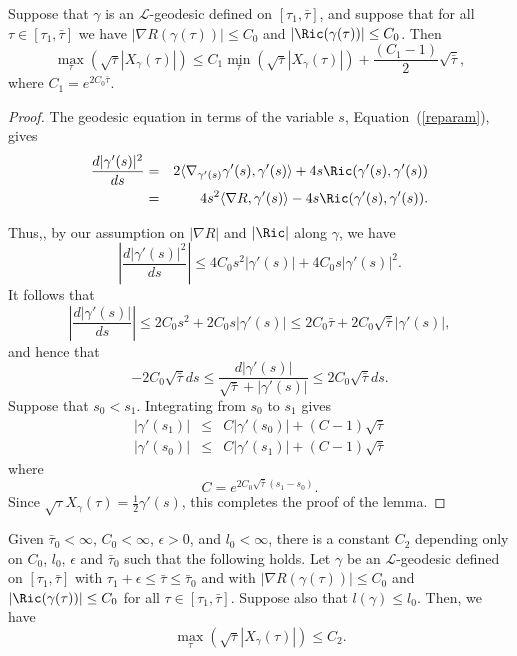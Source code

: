 \begin{lemma}\label{lem:l-geodesic-min-max-estimate}
\label{min-max}
 Suppose  that
$\gamma$ is an ${\mathcal L}$-geodesic defined on
$[\tau_1,\bar\tau]$, and suppose that for all $\tau\in
[\tau_1,\bar\tau]$ we have $|\nabla R(\gamma(\tau))|\le C_0$ and
$|\Ric(\gamma(\tau))|\le C_0$. Then
$$\max_{\tau}\left(\sqrt{\tau}|X_\gamma(\tau)|\right)\le C_1\min_{\tau}\left(\sqrt{\tau}|X_\gamma(\tau)|\right)+\frac{(C_1-1)}{2}\sqrt{\bar\tau},$$
where $C_1=e^{2C_0\bar\tau}$.
\end{lemma}

\begin{proof}
\sketch
{}
The geodesic equation in terms of the variable $s$,
Equation~(\ref{reparam}), gives
\begin{eqnarray}
\frac{d|\gamma'(s)|^2}{ds} & = & 2\langle
\nabla_{\gamma'(s)}\gamma'(s),\gamma'(s)\rangle+4s\Ric(\gamma'(s),\gamma'(s))\nonumber \\
& = & 4s^2\langle\nabla R,\gamma'(s)\rangle -4s\Ric(\gamma'(s),\gamma'(s))\label{nablas}.
\end{eqnarray}

Thus,, by our assumption on $|\nabla R|$ and $|\Ric|$ along
$\gamma$, we have
$$\left|\frac{d|\gamma'(s)|^2}{ds}\right| \le
4C_0s^2|\gamma'(s)|+4C_0s|\gamma'(s)|^2.$$ It follows that
$$\left|\frac{d|\gamma'(s)|}{ds}\right|\le 2C_0s^2+2C_0s|\gamma'(s)|\le 2C_0\bar\tau+2
C_0\sqrt{\bar\tau}|\gamma'(s)|,$$ and hence that
$$-2C_0\sqrt{\bar\tau}ds\le \frac{d|\gamma'(s)|}{\sqrt{\bar\tau}+|\gamma'(s)|}
\le 2C_0\sqrt{\bar\tau}ds.$$ Suppose that $s_0<s_1$. Integrating from $s_0$ to
$s_1$ gives
\begin{eqnarray*}
|\gamma'(s_1)| & \le &  C|\gamma'(s_0)|+(C-1)\sqrt{\bar\tau} \\
|\gamma'(s_0)| & \le & C|\gamma'(s_1)|+(C-1)\sqrt{\bar\tau}
\end{eqnarray*}
where
\begin{equation*}
C=e^{2C_0\sqrt{\bar\tau}(s_1-s_0)}.
\end{equation*}
 Since
$\sqrt{\tau}X_\gamma(\tau)=\frac{1}{2}\gamma'(s)$, this completes
the proof of the lemma.
\end{proof}

\begin{corollary}\label{cor:l-geodesic-speed-bound}
\label{minmax}
Given $\bar\tau_0<\infty$, $C_0<\infty$, $\epsilon>0$, and $l_0<\infty$, there
is a constant $C_2$ depending only on $C_0$, $l_0$, $\epsilon$ and $\bar\tau_0$
such that the following holds. Let $\gamma$ be an ${\mathcal L}$-geodesic
defined on $[\tau_1,\bar\tau]$ with $\tau_1+\epsilon\le\bar\tau\le \bar\tau_0$
and with $|\nabla R(\gamma(\tau))|\le C_0$ and $|\Ric(\gamma(\tau))|\le
C_0$ for all $\tau\in [\tau_1,\bar\tau]$. Suppose also that $ l(\gamma)\le
l_0$. Then, we have
$$\max_{\tau}\left(\sqrt{\tau}|X_\gamma(\tau)|\right)\le C_2.$$
\end{corollary}

